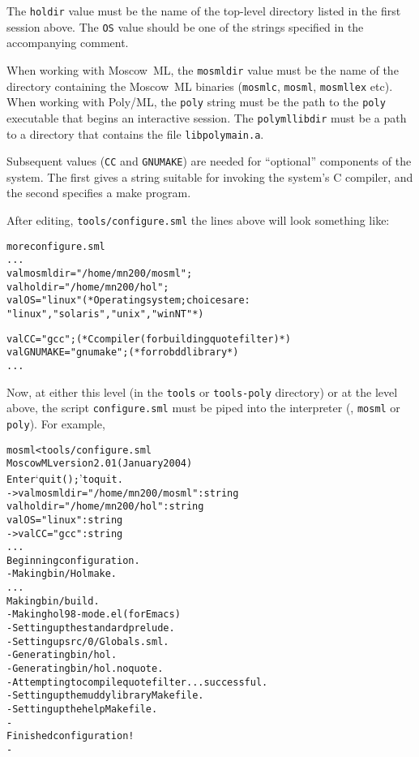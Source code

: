 The \texttt{holdir} value must be the name of the top-level directory
listed in the first session above.  The \texttt{OS} value should be
one of the strings specified in the accompanying comment.

When working with Moscow~ML, the \texttt{mosmldir} value must be the
name of the directory containing the Moscow~ML binaries
(\texttt{mosmlc}, \texttt{mosml}, \texttt{mosmllex} etc).  When
working with Poly/ML, the \texttt{poly} string must be the path to the
\texttt{poly} executable that begins an interactive \ML{} session.
The \texttt{polymllibdir} must be a path to a directory that contains
the file \texttt{libpolymain.a}.

Subsequent values (\texttt{CC} and \texttt{GNUMAKE}) are needed for
``optional'' components of the system.  The first gives a string
suitable for invoking the system's C compiler, and the second
specifies a \textsf{make} program.

After editing, \texttt{tools/configure.sml} the lines above will look
something like:

\begin{session}
\begin{alltt}
\dol more configure.sml
  ...
val mosmldir = "/home/mn200/mosml";
val holdir   = "/home/mn200/hol";
val OS       = "linux"       (* Operating system; choices are:
                                "linux", "solaris", "unix", "winNT" *)

val CC       = "gcc";     (* C compiler (for building quote filter)        *)
val GNUMAKE  = "gnumake"; (* for robdd library                             *)
  ...
\dol
\end{alltt}
\end{session}

\noindent Now, at either this level (in the \texttt{tools} or
\texttt{tools-poly} directory) or at the level above, the script
\texttt{configure.sml} must be piped into the \ML{} interpreter (\ie,
\texttt{mosml} or \texttt{poly}).  For example,

\begin{session}
\begin{alltt}
\dol mosml < tools/configure.sml
Moscow ML version 2.01 (January 2004)
Enter `quit();' to quit.
- > val mosmldir = "/home/mn200/mosml" : string
  val holdir = "/home/mn200/hol" : string
  val OS = "linux" : string
- > val CC = "gcc" : string
  ...
Beginning configuration.
- Making bin/Holmake.
  ...
Making bin/build.
- Making hol98-mode.el (for Emacs)
- Setting up the standard prelude.
- Setting up src/0/Globals.sml.
- Generating bin/hol.
- Generating bin/hol.noquote.
- Attempting to compile quote filter ... successful.
- Setting up the muddy library Makefile.
- Setting up the help Makefile.
-
Finished configuration!
-
\dol
\end{alltt}
\end{session}



